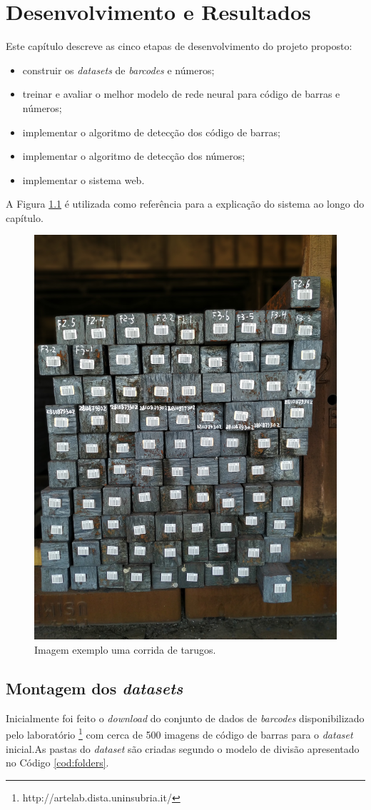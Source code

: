
\chapter{Desenvolvimento e Resultados}

Este capítulo descreve as cinco etapas de desenvolvimento do projeto proposto:

\begin{itemize}
    \item construir os \textit{datasets} de \textit{barcodes} e números;
    \item treinar e avaliar o melhor modelo de rede neural para código de barras e números;
    \item implementar o algoritmo de detecção dos código de barras;
    \item implementar o algoritmo de detecção dos números;
    \item implementar o sistema web.
\end{itemize}

A Figura \ref{fig:imagemBase} é utilizada como referência para a explicação do sistema ao longo do capítulo.

\begin{figure}[h!]
	\centering
	\includegraphics[width=0.5\linewidth]{figuras/img1.jpg}
	\caption{Imagem exemplo uma corrida de tarugos.}
	\label{fig:imagemBase}
\end{figure}

\section{Montagem dos \textit{datasets}}

Inicialmente foi feito o \textit{download} do conjunto de dados de \textit{barcodes} disponibilizado pelo laboratório \citeauthor{Arte-Lab}\footnote{http://artelab.dista.uninsubria.it/} com cerca de 500 imagens de código de barras para o \textit{dataset} inicial.As pastas do \textit{dataset} são criadas segundo o modelo de divisão apresentado no Código \ref{cod:folders}.

